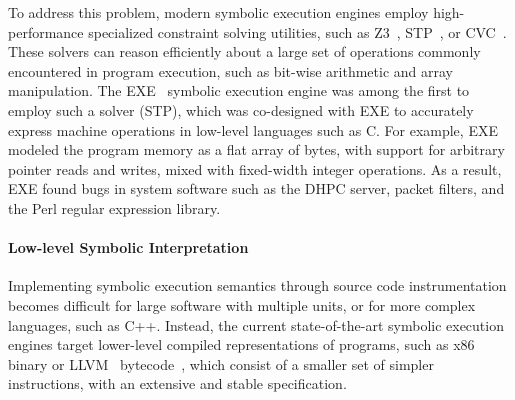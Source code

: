To address this problem, modern symbolic execution engines employ high-performance specialized constraint solving utilities, such as Z3~\cite{Z3}, STP~\cite{stp}, or CVC~\cite{cvc}.  These solvers can reason efficiently about a large set of operations commonly encountered in program execution, such as bit-wise arithmetic and array manipulation.
%
The EXE~\cite{exe} symbolic execution engine was among the first to employ such a solver (STP), which was co-designed with EXE to accurately express machine operations in low-level languages such as C.
%
For example, EXE modeled the program memory as a flat array of bytes, with support for arbitrary pointer reads and writes, mixed with fixed-width integer operations.
%
As a result, EXE found bugs in system software such as the  DHPC server, packet filters, and the  Perl regular expression library.

\paragraph{Low-level Symbolic Interpretation}

Implementing symbolic execution semantics through source code instrumentation becomes difficult for large software with multiple units, or for more complex languages, such as C++.
%
Instead, the current state-of-the-art symbolic execution engines target lower-level compiled representations of programs, such as x86 binary or LLVM~\cite{llvm} bytecode~\cite{godefroid:fuzz,klee,bitBlaze,s2eSystem,mayhem}, which consist of a smaller set of simpler instructions, with an extensive and stable specification.



